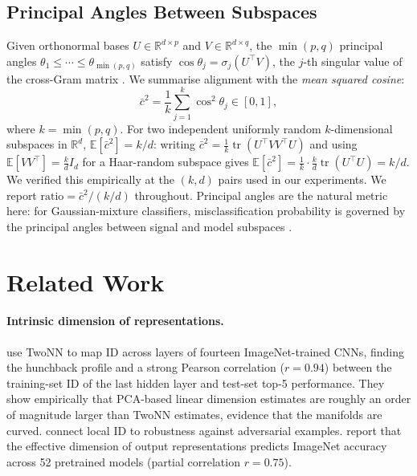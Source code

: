 \documentclass{article}
\newcommand{\R}{\mathbb{R}}
\newcommand{\E}{\mathbb{E}}
\newcommand{\kcos}{\bar{c}^2}           %
\begin{document}
\subsection{Principal Angles Between Subspaces}
\label{sec:angles}

Given orthonormal bases $U\in\R^{d\times p}$ and $V\in\R^{d\times q}$, the
$\min(p,q)$ principal angles $\theta_1\le\cdots\le\theta_{\min(p,q)}$ satisfy
$\cos\theta_j = \sigma_j(U^\top V)$, the $j$-th singular value of the
cross-Gram matrix \citep{bjorck1973numerical}.  We summarise alignment with the
\emph{mean squared cosine}:
\begin{equation}
\kcos = \frac{1}{k}\sum_{j=1}^{k}\cos^2\!\theta_j \in [0,1],
\label{eq:alignment}
\end{equation}
where $k = \min(p,q)$.  For two independent uniformly random $k$-dimensional
subspaces in $\R^d$, $\E[\kcos] = k/d$: writing $\kcos =
\frac1k\operatorname{tr}(U^\top V V^\top U)$ and using
$\E[VV^\top] = \frac{k}{d}I_d$ for a Haar-random subspace gives
$\E[\kcos] = \frac1k \cdot \frac{k}{d}\operatorname{tr}(U^\top U) = k/d$.
We verified this empirically at the $(k,d)$ pairs used in our experiments.
We report $\text{ratio} = \kcos/(k/d)$ throughout.  Principal angles are the
natural metric here: for Gaussian-mixture classifiers, misclassification
probability is governed by the principal angles between signal and model
subspaces \citep{huang2016principal}.

\section{Related Work}
\label{sec:related}

\paragraph{Intrinsic dimension of representations.}
\citet{ansuini2019intrinsic} use TwoNN to map ID across layers of fourteen
ImageNet-trained CNNs, finding the hunchback profile and a strong Pearson
correlation ($r=0.94$) between the training-set ID of the last hidden layer
and test-set top-5 performance.  They show empirically that PCA-based linear
dimension estimates are roughly an order of magnitude larger than TwoNN
estimates, evidence that the manifolds are curved.
\citet{ma2018dimensionality} connect local ID to robustness against adversarial
examples.  \citet{yadav2026geometry} report that the effective dimension of
output representations predicts ImageNet accuracy across 52 pretrained models
(partial correlation $r=0.75$).
\end{document}

